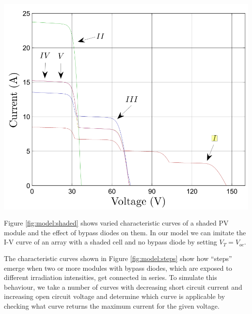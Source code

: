 \begin{minipage}{0.5\textwidth}
	\center
    \includegraphics[width=\textwidth]{images/model/steps.png}
    \label{fig:model:steps}
\end{minipage}


Figure \ref{fig:model:shaded}  shows varied characteristic curves  of a shaded
PV  module and  the effect  of bypass  diodes on  them.  In  our model  we can
imitate the I-V  curve of an array with  a shaded cell and no  bypass diode by
setting $V_T = V_{oc}$.


The  characteristic  curves  shown  in  Figure  \ref{fig:model:steps}  show  how
``steps'' emerge when two or more modules  with bypass diodes, which are exposed
to different irradiation intensities, get  connected in series. To simulate this
behaviour, we take  a number of curves with decreasing short circuit current and
increasing  open  circuit  voltage  and  determine  which curve is applicable by
checking  what  curve  returns  the  maximum  current  for  the  given  voltage.



